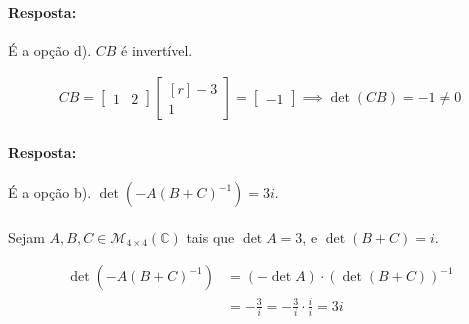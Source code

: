 \grupo{}

\exercicio{}

\paragraph{Resposta:} É a opção d). $CB$ é invertível.



\begin{align*}
	CB =
	\begin{bmatrix*}
		1 & 2
	\end{bmatrix*}
	\begin{bmatrix*}[r]
		-3\\
		1
	\end{bmatrix*}
	=
	\begin{bmatrix}
		-1
	\end{bmatrix} \implies \det (CB) = -1 \neq 0
\end{align*}


\exercicio{}

\paragraph{Resposta:} É a opção b). $\det(-A(B + C)^{-1}) = 3i$.

\paragraph{}Sejam $A, B, C \in \mathcal{M}_{4 \times 4}(\mathbb{C})$ tais que
$\det A = 3$, e $\det(B + C) = i$.


\begin{align*}
	\det(-A(B + C)^{-1})
		   &= (- \det A)  \cdot (\det(B + C))^{-1}\\
		   &= -\frac{3}{i}
		   = -\frac{3}{i} \cdot \frac{i}{i}
		   = 3i
\end{align*}


